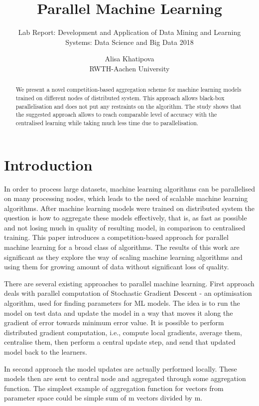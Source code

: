 \documentclass{scrartcl}
\title{Parallel Machine Learning}
\subtitle{Lab Report: Development and Application of Data Mining and Learning Systems: Data Science and Big Data 2018}
\date{}
\author{
Alisa Khatipova\\
RWTH-Aachen University
}
\begin{document}
\maketitle

\begin{abstract}
We present a novel competition-based aggregation scheme for machine learning models trained on different nodes of distributed system.  This approach allows black-box parallelisation and does not put any restraints on the algorithm. The study shows that the suggested approach allows to reach comparable level of accuracy with the centralised learning while taking much less time due to parallelisation.
\end{abstract}

\section{Introduction}
In order to process large datasets, machine learning algorithms can be parallelised on many processing nodes, which leads to the need of scalable machine learning algorithms. After machine learning models were trained on distributed system the question is how to aggregate these models effectively, that is, as fast as possible and not losing much in quality of resulting model, in comparison to centralised training. 
This paper introduces a competition-based approach for parallel machine learning for a broad class of algorithms. The results of this work are significant as they explore the way of scaling machine learning algorithms and using them for growing amount of data without significant loss of quality.

There are several existing approaches to parallel machine learning.
First approach deals with parallel computation of Stochastic Gradient Descent - an optimisation algorithm, used for finding parameters for ML models. The idea is to run the model on test data and update the model in a way that moves it along the gradient of error towards minimum error value. It is possible to perform distributed gradient computation, i.e., compute local gradients, average them, centralise them, then perform a central update step, and send that updated model back to the learners.

In second approach the model updates are actually performed locally. These models then are sent to central node and aggregated through some aggregation function. The simplest example of aggregation function for vectors from parameter space could be simple sum of m vectors divided by m.
\end{document}
